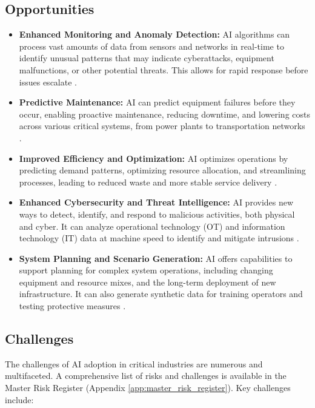 \subsection{Opportunities}
\begin{itemize}
    \item \textbf{Enhanced Monitoring and Anomaly Detection:} AI algorithms can process vast amounts of data from sensors and networks in real-time to identify unusual patterns that may indicate cyberattacks, equipment malfunctions, or other potential threats. This allows for rapid response before issues escalate \parencite{DataFloq2023}.
    \item \textbf{Predictive Maintenance:} AI can predict equipment failures before they occur, enabling proactive maintenance, reducing downtime, and lowering costs across various critical systems, from power plants to transportation networks \parencite{EnergyGov2023}.
    \item \textbf{Improved Efficiency and Optimization:} AI optimizes operations by predicting demand patterns, optimizing resource allocation, and streamlining processes, leading to reduced waste and more stable service delivery \parencite{Checkpoint2023}.
    \item \textbf{Enhanced Cybersecurity and Threat Intelligence:} AI provides new ways to detect, identify, and respond to malicious activities, both physical and cyber. It can analyze operational technology (OT) and information technology (IT) data at machine speed to identify and mitigate intrusions \parencite{EAJournals2023}.
    \item \textbf{System Planning and Scenario Generation:} AI offers capabilities to support planning for complex system operations, including changing equipment and resource mixes, and the long-term deployment of new infrastructure. It can also generate synthetic data for training operators and testing protective measures \parencite{EnergyGov2023}.
\end{itemize}

\subsection{Challenges}

The challenges of AI adoption in critical industries are numerous and multifaceted. A comprehensive list of risks and challenges is available in the Master Risk Register (Appendix \ref{app:master_risk_register}). Key challenges include:

